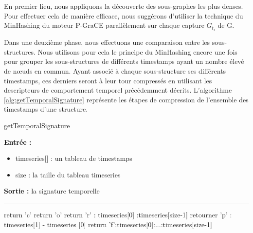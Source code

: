			 En premier lieu, nous appliquons la découverte des sous-graphes les plus denses. Pour effectuer cela de manière efficace, nous suggérons d'utiliser la technique du MinHashing du moteur P-GraCE parallèlement sur chaque capture $G_{t_{i}}$ de G. 
			 
			 
			 Dans une deuxième phase, nous effectuons une comparaison entre les sous-structures. Nous utilisons pour cela le principe du MinHashing encore une fois pour grouper les sous-structures de différents timestamps ayant un nombre élevé de nœuds en commun. Ayant associé à chaque sous-structure ses différents timestamps, ces derniers seront à leur tour compressés en utilisant les descripteurs de comportement temporel précédemment décrits. L'algorithme \ref{alg:getTemporalSignature} représente les étapes de compression de l'ensemble des timestamps d'une structure.\\
			 
			 
			 	\begin{algorithm}[H]
					
					\caption{getTemporalSignature}
					\label{alg:getTemporalSignature}
					\textbf{Entrée :}
						\begin{itemize}[label=$\bullet$]
							\item timeseries[] : un tableau de timestamps
							\item size : la taille du tableau timeseries
						\end{itemize}
					\textbf{Sortie :} la signature temporelle\\							\noindent\rule{\textwidth}{1pt}
						
						
				\begin{algorithmic} [1]
					
						\STATE return 'c' 	
					\ELSE 
							\STATE return 'o' 
						\ELSE
								\STATE return 'r' : timeseries[0] :timeseries[size-1] 
							\ELSE
									\STATE retourner 'p' : timeseries[1] - timeseries [0] 
								\ELSE
									\STATE return 'f':timeseries[0]:...:timeseries[size-1] 
								\ENDIF							
							\ENDIF
						\ENDIF
					\ENDIF
					
				\end{algorithmic}
			\end{algorithm}
			 
